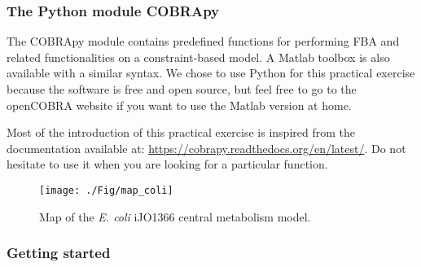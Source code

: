 \documentclass[a4paper,11pt]{exam}
\begin{document}
\subsubsection*{The Python module COBRApy}

The COBRApy module contains predefined functions for performing FBA and related functionalities on a constraint-based model.
A Matlab toolbox is also available with a similar syntax.
We chose to use Python for this practical exercise because the software is free and open source, but feel free to go to the openCOBRA website if you want to use the Matlab version at home.

Most of the introduction of this practical exercise is inspired from the documentation available at: \url{https://cobrapy.readthedocs.org/en/latest/}. Do not hesitate to use it when you are looking for a particular function.

\begin{figure}
\centering
\texttt{[image: ./Fig/map\_coli]}
\caption{Map of the \textit{E. coli} iJO1366 central metabolism model.}
\end{figure}

\subsubsection*{Getting started}
\end{document}
